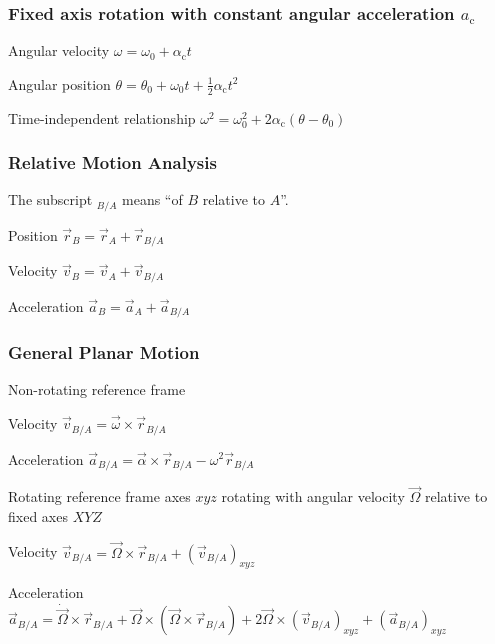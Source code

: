 \documentclass{article}
\begin{document}
\subsubsection{Fixed axis rotation with constant angular acceleration \(a_\mathrm{c}\)}

\begin{description*}
\item[Angular velocity]
  \(\omega = \omega_0 + \alpha_\mathrm{c}t\)
\item[Angular position]
  \(\theta = \theta_0 + \omega_0t + \frac12\alpha_\mathrm{c}t^2\)
\item[Time-independent relationship]
  \(\omega^2 = \omega_0^2 + 2\alpha_\mathrm{c}(\theta-\theta_0)\)
\end{description*}

\subsubsection{Relative Motion Analysis}

The subscript ${}_{B/A}$ means ``of $B$ relative to $A$''.

\begin{description*}
\item[Position]
  \(\vec{r}_B = \vec{r}_A + \vec{r}_{B/A}\)
\item[Velocity]
  \(\vec{v}_B = \vec{v}_A + \vec{v}_{B/A}\)
\item[Acceleration]
  \(\vec{a}_B = \vec{a}_A + \vec{a}_{B/A}\)
\end{description*}

\subsubsection{General Planar Motion}

\begin{description*}
\item[Non-rotating reference frame]~
  \begin{description*}
  \item[Velocity]
    \(\vec{v}_{B/A} = \vec{\omega}\times\vec{r}_{B/A}\)
  \item[Acceleration]
    \(\vec{a}_{B/A} = \vec\alpha\times\vec{r}_{B/A} - \omega^2\vec{r}_{B/A}\)
  \end{description*}
\item[Rotating reference frame] axes $xyz$ rotating with angular velocity $\vec\Omega$
  relative to fixed axes $XYZ$
  \begin{description*}
  \item[Velocity]
    \(\vec{v}_{B/A} = \vec\Omega\times\vec{r}_{B/A} + {(\vec{v}_{B/A})}_{xyz}\)
  \item[Acceleration]
    \(\vec{a}_{B/A} = \dot{\vec\Omega}\times\vec{r}_{B/A} + \vec\Omega\times(\vec\Omega\times\vec{r}_{B/A})
    + 2\vec\Omega\times{(\vec{v}_{B/A})}_{xyz} + {(\vec{a}_{B/A})}_{xyz}\)
  \end{description*}
\end{description*}
\end{document}
